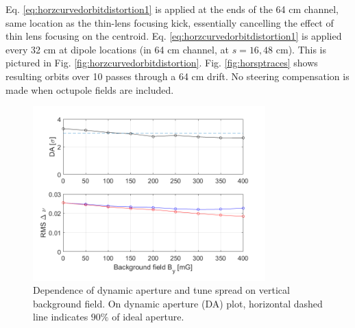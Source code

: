 Eq. \ref{eq:horzcurvedorbitdistortion1} is applied at the ends of the 64 cm channel, same location as the thin-lens focusing kick, essentially cancelling the effect of thin lens focusing on the centroid. Eq. \ref{eq:horzcurvedorbitdistortion1} is applied every 32 cm at dipole locations (in 64 cm channel, at $s=16,48$ cm). This is pictured in Fig. \ref{fig:horzcurvedorbitdistortion}. Fig. \ref{fig:horsptraces} shows resulting orbits over 10 passes through a 64 cm drift. No steering compensation is made when octupole fields are included.

\begin{figure}
\centering
\includegraphics[width=0.8\textwidth]{7.figures/steeringtolerance/DA_deltanu_plots_vs_background_By.png}
\caption{Dependence of dynamic aperture and tune spread on vertical background field. On dynamic aperture (DA) plot, horizontal dashed line indicates $90\%$ of ideal aperture.}
\label{fig:DAvsBGfield}
\end{figure}

